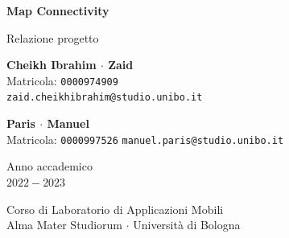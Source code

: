 \documentclass[11pt]{article}
\begin{document}
\begin{titlepage}
    \begin{center}
        \vspace*{3.0cm}
            
        \Huge
        \textbf{Map Connectivity}
            
        \vspace{0.3cm}
        \LARGE
        Relazione progetto

        \vspace{1.5cm}
          
        \begin{minipage}[t]{0.47\textwidth}
            \begin{center}
                {\large{\bf Cheikh Ibrahim $\cdot$ Zaid}}\\
                {\large Matricola: \texttt{0000974909}} \\
                {\large{\texttt{zaid.cheikhibrahim@studio.unibo.it}}}
            \end{center}
    
            \end{minipage}
            \hfill
            \begin{minipage}[t]{0.47\textwidth}\raggedleft
            \begin{center}
                {\large{\bf Paris $\cdot$ Manuel}}\\
                {\large Matricola: \texttt{0000997526}}
                {\large{\texttt{manuel.paris@studio.unibo.it}}}
            \end{center}
        \end{minipage}
            
        \vspace{6cm}
            
        Anno accademico\\
        $2022 - 2023$
            
        \vspace{0.8cm}
            
            
        \Large
        Corso di Laboratorio di Applicazioni Mobili\\
        Alma Mater Studiorum $\cdot$ Università di Bologna\\
            
    \end{center}
\end{titlepage}
\pagebreak
{} 
\tableofcontents
\pagebreak
{} 
\end{document}
